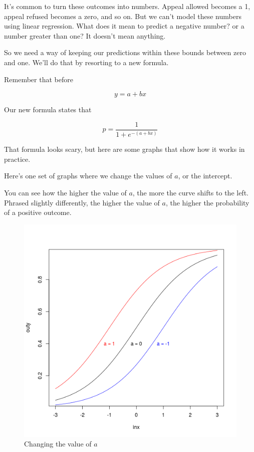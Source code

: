 \documentclass[12pt,twoside]{article}
\begin{document}
It's common to turn these outcomes into numbers. Appeal allowed becomes
a 1, appeal refused becomes a zero, and so on. But we can't model these
numbers using linear regression. What does it mean to predict a negative
number? or a number greater than one? It doesn't mean anything.

So we need a way of keeping our predictions within these bounds between
zero and one. We'll do that by resorting to a new formula.

Remember that before

\[
y = a + bx 
\]

Our new formula states that

\[
p = \frac{1}{1+e^{-(a + bx)}}
\]

That formula looks scary, but here are some graphs that show how it
works in practice.

Here's one set of graphs where we change the values of \(a\), or the
intercept.

You can see how the higher the value of \(a\), the more the curve shifts
to the left. Phrased slightly differently, the higher the value of
\(a\), the higher the probability of a positive outcome.

\begin{figure}[htbp]
\centering
\includegraphics{figure/logitplots1-1.png}
\caption{Changing the value of \(a\)}
\end{figure}
\end{document}
